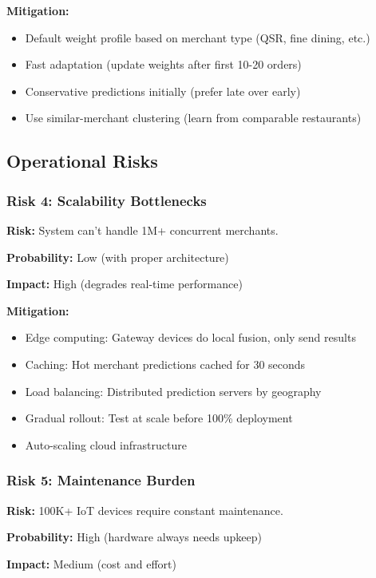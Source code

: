 \documentclass[11pt,a4paper]{article}
\begin{document}
\textbf{Mitigation:}
\begin{itemize}[leftmargin=*]
    \item Default weight profile based on merchant type (QSR, fine dining, etc.)
    \item Fast adaptation (update weights after first 10-20 orders)
    \item Conservative predictions initially (prefer late over early)
    \item Use similar-merchant clustering (learn from comparable restaurants)
\end{itemize}

\subsection{Operational Risks}

\subsubsection{Risk 4: Scalability Bottlenecks}

\textbf{Risk:} System can't handle 1M+ concurrent merchants.

\textbf{Probability:} Low (with proper architecture)

\textbf{Impact:} High (degrades real-time performance)

\textbf{Mitigation:}
\begin{itemize}[leftmargin=*]
    \item Edge computing: Gateway devices do local fusion, only send results
    \item Caching: Hot merchant predictions cached for 30 seconds
    \item Load balancing: Distributed prediction servers by geography
    \item Gradual rollout: Test at scale before 100\% deployment
    \item Auto-scaling cloud infrastructure
\end{itemize}

\subsubsection{Risk 5: Maintenance Burden}

\textbf{Risk:} 100K+ IoT devices require constant maintenance.

\textbf{Probability:} High (hardware always needs upkeep)

\textbf{Impact:} Medium (cost and effort)
\end{document}
